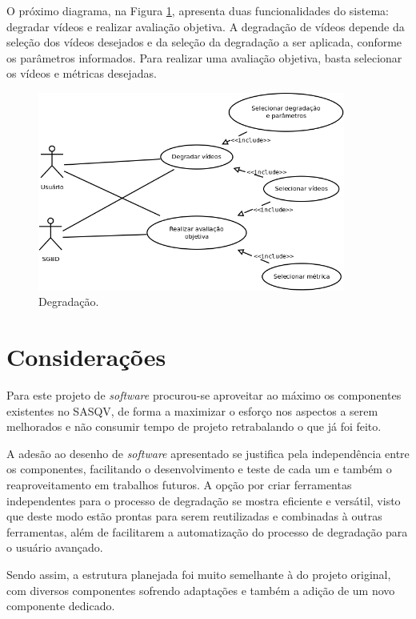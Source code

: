 O próximo diagrama, na Figura \ref{fig:ucddegradacao}, apresenta duas funcionalidades do sistema: degradar vídeos e realizar avaliação objetiva. A degradação de vídeos depende da seleção dos vídeos desejados e da seleção da degradação a ser aplicada, conforme os parâmetros informados. Para realizar uma avaliação objetiva, basta selecionar os vídeos e métricas desejadas.

\begin{figure}[!htb]
	\centering
	\includegraphics[width=0.9\textwidth]{./diagramas/degradacao.png}
	\caption{Degradação.}
	\label{fig:ucddegradacao}
\end{figure}

\section{Considerações}

Para este projeto de \emph{software} procurou-se aproveitar ao máximo os componentes existentes no SASQV, de forma a maximizar o esforço nos aspectos a serem melhorados e não consumir tempo de projeto retrabalando o que já foi feito. 

A adesão ao desenho de \emph{software} apresentado se justifica pela independência entre os componentes, facilitando o desenvolvimento e teste de cada um e também o reaproveitamento em trabalhos futuros.
A opção por criar ferramentas independentes para o processo de degradação se mostra eficiente e versátil, visto que deste modo estão prontas para serem reutilizadas e combinadas à outras ferramentas, além de facilitarem a automatização do processo de degradação para o usuário avançado.

Sendo assim, a estrutura planejada foi muito semelhante à do projeto original, com diversos componentes sofrendo adaptações e também a adição de um novo componente dedicado.
